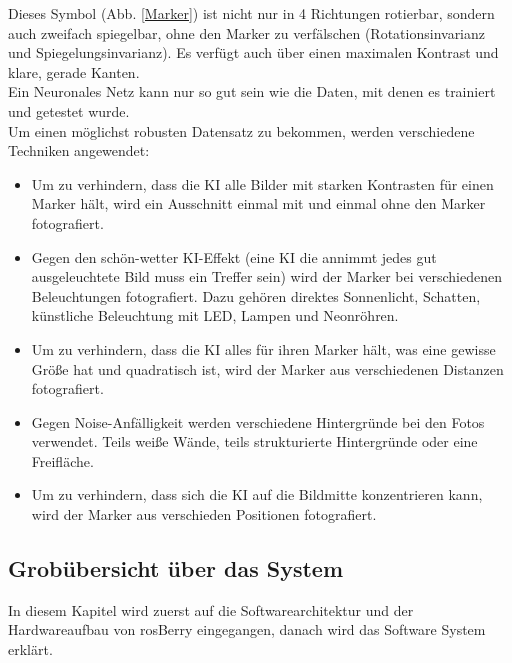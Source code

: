 \documentclass[conference]{IEEEtran}
\begin{document}
	Dieses Symbol (Abb. \ref{Marker}) ist nicht nur in 4 Richtungen rotierbar, sondern auch zweifach spiegelbar, ohne den Marker zu verfälschen (Rotationsinvarianz und Spiegelungsinvarianz).
	Es verfügt auch über einen maximalen Kontrast und klare, gerade Kanten.
	\\
	\noindent
	Ein Neuronales Netz kann nur so gut sein wie die Daten, mit denen es 
	trainiert und getestet wurde.
	\\
	Um einen möglichst robusten Datensatz zu bekommen, werden verschiedene Techniken angewendet:
	\begin{itemize}
		\item Um zu verhindern, dass die KI alle Bilder mit starken Kontrasten für einen Marker hält, wird ein Ausschnitt einmal mit und einmal ohne den Marker fotografiert.
		\item Gegen den \glqq schön-wetter KI\grqq-Effekt (eine KI die annimmt jedes gut ausgeleuchtete Bild muss ein Treffer sein) wird der Marker bei verschiedenen Beleuchtungen fotografiert.
		Dazu gehören direktes Sonnenlicht, Schatten, künstliche Beleuchtung mit LED, Lampen und Neonröhren. 
		\item Um zu verhindern, dass die KI alles für ihren Marker hält, was eine gewisse Größe hat und quadratisch ist, wird der Marker aus verschiedenen Distanzen fotografiert. 
		\item Gegen Noise-Anfälligkeit werden verschiedene Hintergründe bei den Fotos verwendet. Teils weiße Wände, teils strukturierte Hintergründe oder eine Freifläche. 
		\item Um zu verhindern, dass sich die KI auf die Bildmitte konzentrieren kann, wird der Marker aus verschieden Positionen fotografiert. 
	\end{itemize}
	
	
	\subsection{Grobübersicht über das System}
	In diesem Kapitel wird zuerst auf die Softwarearchitektur und der 
	Hardwareaufbau von rosBerry eingegangen, danach wird das Software 
	System erklärt.
	
\end{document}
